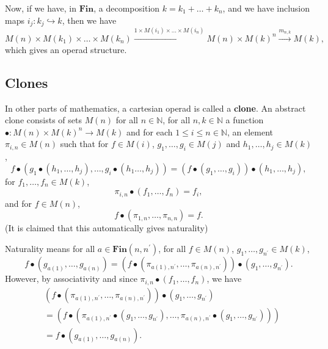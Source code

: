 \documentclass{amsbook}
\newcommand{\Catb}[1]{\mathbf{#1}}
\newcommand{\FIN}{\Catb{Fin}}
\newcommand{\Hom}[3]{{#1}(#2,#3)}
\begin{document}
  Now, if we have, in $ \FIN $, a decomposition $ k = k_1 + \dots + k_n $, and we have inclusion maps $ i_j: k_j \hookrightarrow k $, then we have
  \[ M(n) \times M(k_1) \times \dots \times M(k_n) \xrightarrow{1 \times M(i_1) \times \dots \times M(i_n)} M(n) \times M(k)^n \xrightarrow{m_{n, k}} M(k), \]
  which gives an operad structure.

  \subsection{Clones}
  In other parts of mathematics, a cartesian operad is called a \textbf{clone}. An abstract clone consists of sets $ M(n) $ for all $ n \in \mathbb N $, for all $ n, k \in \mathbb N $ a function $ \bullet: M(n) \times M(k)^n \to M(k) $ and for each $ 1 \leq i \leq n \in \mathbb N $, an element $ \pi_{i, n} \in M(n) $ such that for $ f \in M(i) $, $ g_1, \dots, g_i \in M(j) $ and $ h_1, \dots, h_j \in M(k) $,
  \[ f \bullet (g_1 \bullet (h_1, \dots, h_j), \dots, g_i \bullet (h_1 \dots, h_j)) = (f \bullet (g_1, \dots, g_i)) \bullet (h_1, \dots, h_j), \]
  for $ f_1, \dots, f_n \in M(k) $,
  \[ \pi_{i, n} \bullet (f_1, \dots, f_n) = f_i, \]
  and for $ f \in M(n) $,
  \[ f \bullet (\pi_{1, n}, \dots, \pi_{n, n}) = f. \]
  (It is claimed that this automatically gives naturality)

  Naturality means for all $ a \in \Hom{\FIN}{n}{n^\prime} $, for all $ f \in M(n) $, $ g_1, \dots, g_{n^\prime} \in M(k) $,
  \[ f \bullet (g_{a(1)}, \dots, g_{a(n)}) = (f \bullet (\pi_{a(1), n^\prime}, \dots, \pi_{a(n), n^\prime})) \bullet (g_1, \dots, g_{n^\prime}). \]
  However, by associativity and since $ \pi_{i, n} \bullet (f_1, \dots, f_n) $, we have
  \begin{align*}
    & (f \bullet (\pi_{a(1), n^\prime}, \dots, \pi_{a(n), n^\prime})) \bullet (g_1, \dots, g_{n^\prime})\\
    &= (f \bullet (\pi_{a(1), n^\prime} \bullet (g_1, \dots, g_{n^\prime}), \dots, \pi_{a(n), n^\prime} \bullet (g_1, \dots, g_{n^\prime})))\\
    &= f \bullet (g_{a(1)}, \dots, g_{a(n)}).
  \end{align*}
\end{document}
